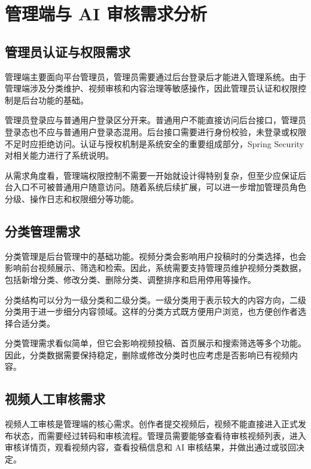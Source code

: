 \section{管理端与 AI 审核需求分析}
\label{sec:admin-ai-requirements}

\subsection{管理员认证与权限需求}
\label{subsec:admin-auth-requirements}

管理端主要面向平台管理员，管理员需要通过后台登录后才能进入管理系统。由于管理端涉及分类维护、视频审核和内容治理等敏感操作，因此管理员认证和权限控制是后台功能的基础。

管理员登录应与普通用户登录区分开来。普通用户不能直接访问后台接口，管理员登录态也不应与普通用户登录态混用。后台接口需要进行身份校验，未登录或权限不足时应拒绝访问。认证与授权机制是系统安全的重要组成部分，Spring Security 对相关能力进行了系统说明\cite{springsecuritydocs}。

从需求角度看，管理端权限控制不需要一开始就设计得特别复杂，但至少应保证后台入口不可被普通用户随意访问。随着系统后续扩展，可以进一步增加管理员角色分级、操作日志和权限细分等功能。

\subsection{分类管理需求}
\label{subsec:category-management-requirements}

分类管理是后台管理中的基础功能。视频分类会影响用户投稿时的分类选择，也会影响前台视频展示、筛选和检索。因此，系统需要支持管理员维护视频分类数据，包括新增分类、修改分类、删除分类、调整排序和启用停用等操作。

分类结构可以分为一级分类和二级分类。一级分类用于表示较大的内容方向，二级分类用于进一步细分内容领域。这样的分类方式既方便用户浏览，也方便创作者选择合适分类。

分类管理需求看似简单，但它会影响视频投稿、首页展示和搜索筛选等多个功能。因此，分类数据需要保持稳定，删除或修改分类时也应考虑是否影响已有视频内容。

\subsection{视频人工审核需求}
\label{subsec:manual-audit-requirements}

视频人工审核是管理端的核心需求。创作者提交视频后，视频不能直接进入正式发布状态，而需要经过转码和审核流程。管理员需要能够查看待审核视频列表，进入审核详情页，观看视频内容，查看投稿信息和 AI 审核结果，并做出通过或驳回决定。

